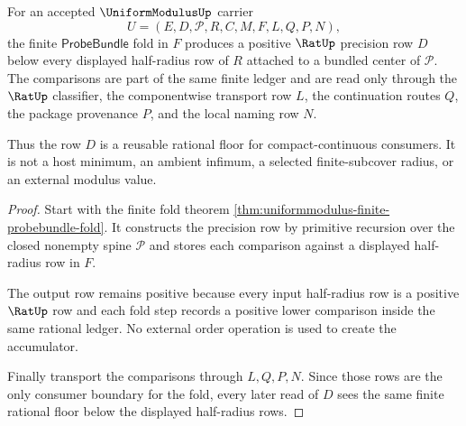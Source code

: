 \begin{theorem}
\label{thm:uniformmodulus-rat-positive-fold-floor}
For an accepted $\UniformModulusUp$ carrier
$$
U=(E,D,\mathcal{P},R,C,M,F,L,Q,P,N),
$$
the finite $\mathsf{ProbeBundle}$ fold in $F$ produces a positive $\RatUp$ precision row $D$ below every displayed half-radius row of $R$ attached to a bundled center of $\mathcal{P}$. The comparisons are part of the same finite ledger and are read only through the $\RatUp$ classifier, the componentwise transport row $L$, the continuation routes $Q$, the package provenance $P$, and the local naming row $N$.

Thus the row $D$ is a reusable rational floor for compact-continuous consumers. It is not a host minimum, an ambient infimum, a selected finite-subcover radius, or an external modulus value.
\end{theorem}
\begin{proof}
Start with the finite fold theorem \autoref{thm:uniformmodulus-finite-probebundle-fold}. It constructs the precision row by primitive recursion over the closed nonempty spine $\mathcal{P}$ and stores each comparison against a displayed half-radius row in $F$.

The output row remains positive because every input half-radius row is a positive $\RatUp$ row and each fold step records a positive lower comparison inside the same rational ledger. No external order operation is used to create the accumulator.

Finally transport the comparisons through $L,Q,P,N$. Since those rows are the only consumer boundary for the fold, every later read of $D$ sees the same finite rational floor below the displayed half-radius rows.
\end{proof}

